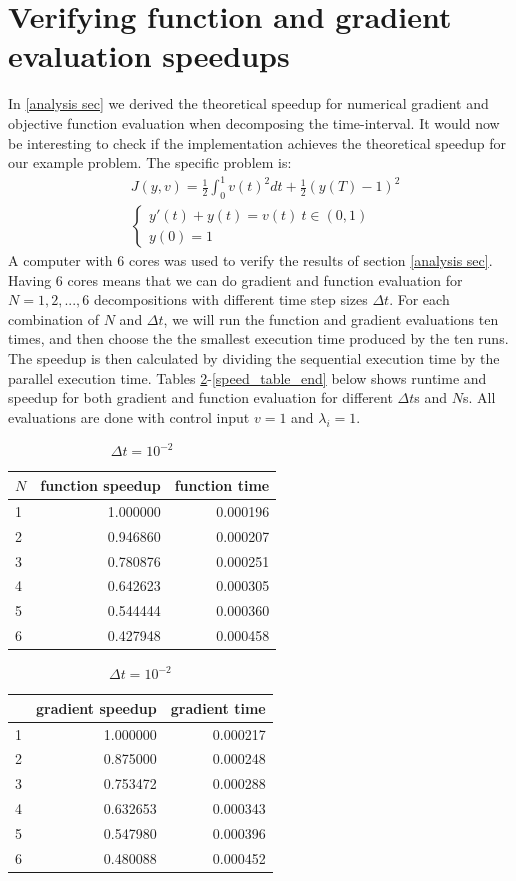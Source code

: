 \section{Verifying function and gradient evaluation speedups} \label{ver S sec}
In \ref{analysis sec} we derived the theoretical speedup for numerical gradient and objective function evaluation when decomposing the time-interval. It would now be interesting to check if the implementation achieves the theoretical speedup for our example problem. The specific problem is:
\begin{align*}
&J(y,v) = \frac{1}{2}\int_0^1v(t)^2dt + \frac{1}{2}(y(T)-1)^2 \\
&\left\{
     \begin{array}{lr}
       	y'(t)+y(t) = v(t) \ t\in(0,1)\\
       	y(0)=1
     \end{array}
   \right. 
\end{align*}
A computer with 6 cores was used to verify the results of section \ref{analysis sec}. Having 6 cores means that we can do gradient and function evaluation for $N=1,2,...,6$ decompositions with different time step sizes $\Delta t$. For each combination of $N$ and $\Delta t$, we will run the function and gradient evaluations ten times, and then choose the the smallest execution time produced by the ten runs. The speedup is then calculated by dividing the sequential execution time by the parallel execution time. Tables \ref{Speed_table1}-\ref{speed_table_end} below shows runtime and speedup for both gradient and function evaluation for different $\Delta t$s and $N$s. All evaluations are done with control input $v=1$ and $\lambda_i=1$.  
\\
\begin{table}[!h]
\centering
\caption{$\Delta t=10^{-2}$}
\label{Speed_table1}
\begin{tabular}{lrr}
\toprule
{} $N$&   function speedup &      function time \\
\midrule
1 &  1.000000 &  0.000196 \\
2 &  0.946860 &  0.000207 \\
3 &  0.780876 &  0.000251 \\
4 &  0.642623 &  0.000305 \\
5 &  0.544444 &  0.000360 \\
6 &  0.427948 &  0.000458 \\
\bottomrule
\end{tabular}
\begin{tabular}{lrr}
\toprule
{} &  gradient speedup &     gradient time \\
\midrule
1 &  1.000000 &  0.000217 \\
2 &  0.875000 &  0.000248 \\
3 &  0.753472 &  0.000288 \\
4 &  0.632653 &  0.000343 \\
5 &  0.547980 &  0.000396 \\
6 &  0.480088 &  0.000452 \\
\bottomrule
\end{tabular}
\end{table}
